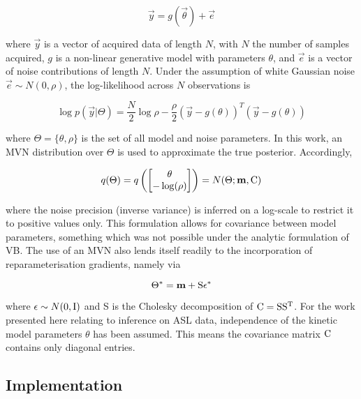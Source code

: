 \begin{equation}
\vec{y} = g(\vec{\theta}) + \vec{e} 
\end{equation}

where $\vec{y}$ is a vector of acquired data of length $N$, with $N$ the number of samples acquired, $g$ is a non-linear generative model with parameters $\theta$, and $\vec{e}$ is a vector of noise contributions of length $N$. Under the assumption of white Gaussian noise $\vec{e} 
\sim N(0, \rho)$, the log-likelihood across $N$ observations is 

\begin{equation}
\log p(\vec{y} | \Theta) = \frac{N}{2} \log \rho - \frac{\rho}{2} (\vec{y} - g(\theta))^T (\vec{y} - g(\theta))
\end{equation}

where $\Theta = \{ \theta, \rho \}$ is the set of all model and noise parameters. In this work, an MVN distribution over $\Theta$ is used to approximate the true posterior. Accordingly,  

\begin{equation}
q(\Theta) = q \left( \begin{bmatrix} \theta \\ -\log(\rho) \end{bmatrix} \right) = N(\Theta; \mathbf{m}, \mathrm{C})
\end{equation}

where the noise precision (inverse variance) is inferred on a log-scale to restrict it to positive values only. This formulation allows for covariance between model parameters, something which was not possible under the analytic formulation of VB. The use of an MVN also lends itself readily to the incorporation of reparameterisation gradients, namely via

\begin{equation}
\Theta^* = \mathbf{m} + \mathrm{S}\epsilon^* 
\end{equation}

where $\epsilon \sim N(0,\mathrm{I})$ and S is the Cholesky decomposition of $\mathrm{C} = \mathrm{SS^T}$. For the work presented here relating to inference on ASL data, independence of the kinetic model parameters $\theta$ has been assumed. This means the covariance matrix $\mathrm{C}$ contains only diagonal entries. 

\subsection{Implementation}

